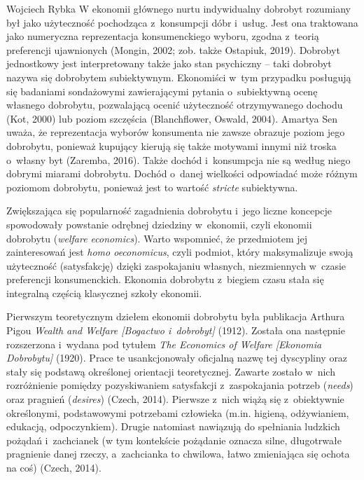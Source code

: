 \begin{artplenv}{Wojciech Rybka}
W ekonomii głównego nurtu indywidualny dobrobyt rozumiany był jako użyteczność pochodząca z~konsumpcji dóbr i~usług.
Jest ona traktowana jako numeryczna reprezentacja konsumenckiego wyboru, zgodna z~teorią preferencji ujawnionych
\label{ref:RND6kRFXHPUSR}(Mongin, 2002; zob. także Ostapiuk, 2019). Dobrobyt jednostkowy jest interpretowany także jako
stan psychiczny -- taki dobrobyt nazywa się dobrobytem subiektywnym. Ekonomiści w~tym przypadku posługują się badaniami
sondażowymi zawierającymi pytania o~subiektywną ocenę własnego dobrobytu, pozwalającą ocenić użyteczność otrzymywanego
dochodu \label{ref:RND3AEtRWbL8h}(Kot, 2000) lub poziom szczęścia \label{ref:RNDid4lYzkFcS}(Blanchflower, Oswald,
2004). Amartya Sen uważa, że reprezentacja wyborów konsumenta nie zawsze obrazuje poziom jego dobrobytu, ponieważ
kupujący kierują się także motywami innymi niż troska o~własny byt \label{ref:RNDbQusAffsdF}(Zaremba, 2016). Także
dochód i~konsumpcja nie są według niego dobrymi miarami dobrobytu. Dochód o~danej wielkości odpowiadać może różnym
poziomom dobrobytu, ponieważ jest to wartość \textit{stricte} subiektywna. 

Zwiększająca się popularność zagadnienia dobrobytu i~jego liczne koncepcje spowodowały powstanie odrębnej
dziedziny w~ekonomii, czyli ekonomii dobrobytu (\textit{welfare economics}). Warto wspomnieć,
że przedmiotem jej zainteresowań jest
\textit{homo oeconomicus}, czyli podmiot, który maksymalizuje swoją użyteczność (satysfakcję) dzięki zaspokajaniu
własnych, niezmiennych w~czasie preferencji konsumenckich. Ekonomia dobrobytu z~biegiem czasu stała się integralną
częścią klasycznej szkoły ekonomii. 

Pierwszym teoretycznym dziełem ekonomii dobrobytu była publikacja Arthura Pigou  \textit{Wealth and Welfare
[Bogactwo i~dobrobyt]} \label{ref:RNDLKGPhide3U}(1912). Została ona następnie rozszerzona i~wydana pod tytułem \textit{The
Economics of Welfare [Ekonomia Dobrobytu]} \label{ref:RNDT12Fu6D2x7}(1920). Prace te usankcjonowały oficjalną nazwę tej
dyscypliny oraz stały się podstawą określonej orientacji teoretycznej. Zawarte zostało w~nich rozróżnienie pomiędzy
pozyskiwaniem satysfakcji z~zaspokajania potrzeb (\textit{needs}) oraz pragnień (\textit{desires})
\label{ref:RNDsWeO2W26RW}(Czech, 2014). Pierwsze z~nich wiążą się z~obiektywnie określonymi, podstawowymi potrzebami
człowieka (m.in. higieną, odżywianiem, edukacją, odpoczynkiem). Drugie natomiast nawiązują do spełniania ludzkich
pożądań i~zachcianek (w tym kontekście pożądanie oznacza silne, długotrwałe pragnienie danej rzeczy, a~zachcianka to
chwilowa, łatwo zmieniająca się ochota na coś) \label{ref:RND1XYB7nX5cQ}(Czech, 2014).


\end{artplenv}
